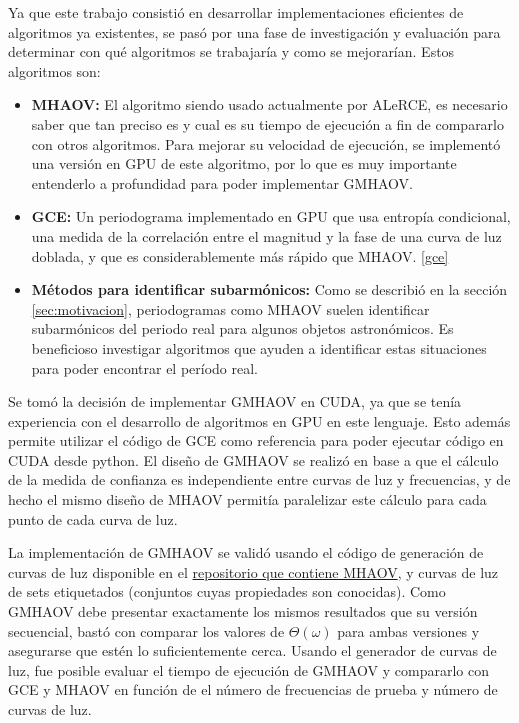 Ya que este trabajo consistió en desarrollar implementaciones eficientes de algoritmos ya existentes, se pasó por una fase de investigación y evaluación para determinar con qué algoritmos se trabajaría y como se mejorarían. Estos algoritmos son:
\begin{itemize}
    \item {\bf MHAOV:} El algoritmo siendo usado actualmente por ALeRCE, es necesario saber que tan preciso es y cual es su tiempo de ejecución a fin de compararlo con otros algoritmos. Para mejorar su velocidad de ejecución, se implementó una versión en GPU de este algoritmo, por lo que es muy importante entenderlo a profundidad para poder implementar GMHAOV.
    \item {\bf GCE:} Un periodograma implementado en GPU que usa entropía condicional, una medida de la correlación entre el magnitud y la fase de una curva de luz doblada, y que es considerablemente más rápido que MHAOV. \ref{gce}
    \item {\bf Métodos para identificar subarmónicos:} Como se describió en la sección \ref{sec:motivacion}, periodogramas como MHAOV suelen identificar subarmónicos del periodo real para algunos objetos astronómicos. Es beneficioso investigar algoritmos que ayuden a identificar estas situaciones para poder encontrar el período real.
\end{itemize}

Se tomó la decisión de implementar GMHAOV en CUDA, ya que se tenía experiencia con el desarrollo de algoritmos en GPU en este lenguaje. Esto además permite utilizar el código de GCE como referencia para poder ejecutar código en CUDA desde python. El diseño de GMHAOV se realizó en base a que el cálculo de la medida de confianza es independiente entre curvas de luz y frecuencias, y de hecho el mismo diseño de MHAOV permitía paralelizar este cálculo para cada punto de cada curva de luz.

La implementación de GMHAOV se validó usando el código de generación de curvas de luz disponible en el 
\href{https://github.com/alercebroker/P4J}{repositorio que contiene MHAOV}, y curvas de luz de sets etiquetados (conjuntos cuyas propiedades son conocidas). Como GMHAOV debe presentar exactamente los mismos resultados que su versión secuencial, bastó con comparar los valores de $\Theta(\omega)$ para ambas versiones y asegurarse que estén lo suficientemente cerca. Usando el generador de curvas de luz, fue posible evaluar el tiempo de ejecución de GMHAOV y compararlo con GCE y MHAOV en función de el número de frecuencias de prueba y número de curvas de luz.

